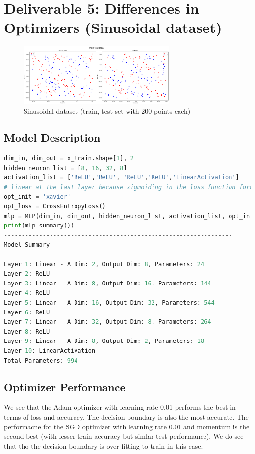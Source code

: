 
\section{Deliverable 5: Differences in Optimizers (Sinusoidal dataset)}


\begin{solve}    

\begin{figure}[H]
    \centering
    \includegraphics[width=0.7\textwidth]{plots/sinusoid_dataset.png}
    \caption{Sinusoidal dataset (train, test set with 200 points each)}
\end{figure}

\subsection*{Model Description}

\begin{lstlisting}[language=python]
dim_in, dim_out = x_train.shape[1], 2
hidden_neuron_list = [8, 16, 32, 8]
activation_list = ['ReLU','ReLU', 'ReLU','ReLU','LinearActivation'] 
# linear at the last layer because sigmoiding in the loss function forward pass for CrossEntropyLoss
opt_init = 'xavier'
opt_loss = CrossEntropyLoss()
mlp = MLP(dim_in, dim_out, hidden_neuron_list, activation_list, opt_init)
print(mlp.summary())
-----------------------------------------------------------------
Model Summary
-------------
Layer 1: Linear - A Dim: 2, Output Dim: 8, Parameters: 24
Layer 2: ReLU
Layer 3: Linear - A Dim: 8, Output Dim: 16, Parameters: 144
Layer 4: ReLU
Layer 5: Linear - A Dim: 16, Output Dim: 32, Parameters: 544
Layer 6: ReLU
Layer 7: Linear - A Dim: 32, Output Dim: 8, Parameters: 264
Layer 8: ReLU
Layer 9: Linear - A Dim: 8, Output Dim: 2, Parameters: 18
Layer 10: LinearActivation
Total Parameters: 994
    \end{lstlisting}


\subsection{Optimizer Performance}
We see that the Adam optimizer with learning rate 0.01 performs the best in terms of loss and accuracy. The decision boundary is also the most accurate. The performacne for the SGD optimizer with learning rate 0.01 and momentum is the second best (with lesser train accuracy but simlar test performance). We do see that tho the decision boundary is over fitting to train in this case.


\end{solve}
